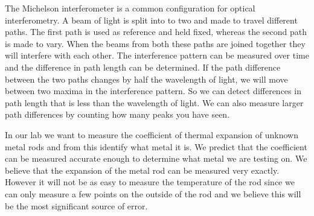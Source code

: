 
The Michelson interferometer is a common configuration for optical interferometry. A beam of light is split
into to two and made to travel different paths. The first path is used as reference and held fixed, whereas the second path is made to vary. When the beams from both these paths are joined together they will interfere with each other. The interference pattern can be measured over time and the difference in path length can be determined.
If the path difference between the two paths changes by half the wavelength of light, we will move between two maxima in the interference pattern. So we can detect differences in path length that is less than the wavelength of light. We can also measure larger path differences by counting how many peaks you have seen.




In our lab we want to measure the coefficient of thermal expansion of unknown metal rods and from this identify what metal it is. We predict that the coefficient can be measured accurate enough to determine
what metal we are testing on. We believe that the expansion of the metal rod can be measured very exactly.
However it will not be as easy to measure the temperature of the rod since we can only measure a few points on the outside of the rod and we believe this will be the most significant source of error.